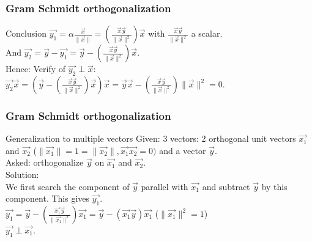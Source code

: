\begin{frame}
	\frametitle{Gram Schmidt orthogonalization}
	\begin{block}{Conclusion}
		$\overrightarrow{y_1}=\alpha\frac{\overrightarrow{x}}{\|\overrightarrow{x}\|}=(\frac{\overrightarrow{x}\overrightarrow{y}}{\|\overrightarrow{x}\|^2})\overrightarrow{x}$ with $\frac{\overrightarrow{x}\overrightarrow{y}}{\|\overrightarrow{x}\|^2}$ a scalar.\\
		And $\overrightarrow{y_2}=\overrightarrow{y}-\overrightarrow{y_1}=\overrightarrow{y}-(\frac{\overrightarrow{x}\overrightarrow{y}}{\|\overrightarrow{x}\|^2})\overrightarrow{x}$.\\
		Hence:
		Verify of $\overrightarrow{y_2}\perp\overrightarrow{x}$:\\
		$\overrightarrow{y_2}\overrightarrow{x}=(\overrightarrow{y}-(\frac{\overrightarrow{x}\overrightarrow{y}}{\|\overrightarrow{x}\|^2})\overrightarrow{x})\overrightarrow{x}=\overrightarrow{y}\overrightarrow{x}-(\frac{\overrightarrow{x}\overrightarrow{y}}{\|\overrightarrow{x}\|^2})\|\overrightarrow{x}\|^2=0$.
	\end{block} 
\end{frame}

\begin{frame}
	\frametitle{Gram Schmidt orthogonalization}
	\begin{block}{Generalization to multiple vectors}
		Given: 3 vectors: 2 orthogonal unit vectors $\overrightarrow{x_1}$ and $\overrightarrow{x_2}$ ($\|\overrightarrow{x_1}\|=1=\|\overrightarrow{x_2}\|,\overrightarrow{x_1}\overrightarrow{x_2}=0)$ and a vector $\overrightarrow{y}$.\\
		Asked: orthogonalize $\overrightarrow{y}$ on $\overrightarrow{x_1}$ and $\overrightarrow{x_2}$.\\
		Solution:\\
		We first search the component of $\overrightarrow{y}$ parallel with $\overrightarrow{x_1}$ and subtract $\overrightarrow{y}$ by this component. This gives $\overrightarrow{y_1}$.\\
		$\overrightarrow{y_1}=\overrightarrow{y}-(\frac{\overrightarrow{x_1}\overrightarrow{y}}{\|\overrightarrow{x_1}\|^2})\overrightarrow{x_1}=\overrightarrow{y}-(\overrightarrow{x_1}\overrightarrow{y})\overrightarrow{x_1}$ ($\|\overrightarrow{x_1}\|^2=1$)\\
		$\overrightarrow{y_1}\perp\overrightarrow{x_1}$.
	\end{block} 
\end{frame}

